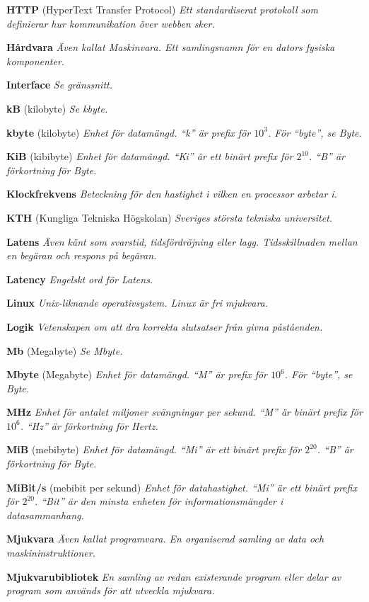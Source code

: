 \documentclass[a4paper, twoside, 11pt, titlepage]{article}
\begin{document}
	\textbf{HTTP} (HyperText Transfer Protocol) \emph{Ett standardiserat protokoll som definierar hur kommunikation över webben sker.}

	\textbf{Hårdvara} \emph{Även kallat Maskinvara. Ett samlingsnamn för en dators fysiska komponenter.}

	\textbf{Interface} \emph{Se gränssnitt.}

	\textbf{kB} (kilobyte) \emph{Se kbyte.}

	\textbf{kbyte} (kilobyte) \emph{Enhet för datamängd. ``k'' är prefix för $10^{3}$. För ``byte'', se Byte.}

	\textbf{KiB} (kibibyte) \emph{Enhet för datamängd. ``Ki'' är ett binärt prefix för $2^{10}$. ``B'' är förkortning för Byte.}

	\textbf{Klockfrekvens} \emph{Beteckning för den hastighet i vilken en processor arbetar i.}

	\textbf{KTH} (Kungliga Tekniska Högskolan) \emph{Sveriges största tekniska universitet.}

	\textbf{Latens} \emph{Även känt som svarstid, tidsfördröjning eller lagg. Tidsskillnaden mellan en begäran och respons på begäran.}

	\textbf{Latency} \emph{Engelskt ord för Latens.}

	\textbf{Linux} \emph{Unix-liknande operativsystem. Linux är fri mjukvara.}

	\textbf{Logik} \emph{Vetenskapen om att dra korrekta slutsatser från givna påståenden.}

	\textbf{Mb} (Megabyte) \emph{Se Mbyte.}

	\textbf{Mbyte} (Megabyte) \emph{Enhet för datamängd. ``M'' är prefix för $10^{6}$.  För ``byte'', se Byte.}

	\textbf{MHz} \emph{Enhet för antalet miljoner svängningar per sekund. ``M'' är binärt prefix för $10^{6}$. ``Hz'' är förkortning för Hertz.}

	\textbf{MiB} (mebibyte) \emph{Enhet för datamängd. ``Mi'' är ett binärt prefix för $2^{20}$. ``B'' är förkortning för Byte.}

	\textbf{MiBit/s} (mebibit per sekund) \emph{Enhet för datahastighet. ``Mi'' är ett binärt prefix för $2^{20}$. ``Bit'' är den minsta enheten för informationsmängder i datasammanhang.}

	\textbf{Mjukvara} \emph{Även kallat programvara. En organiserad samling av data och maskininstruktioner.}

	\textbf{Mjukvarubibliotek} \emph{En samling av redan existerande program eller delar av program som används för att utveckla mjukvara.}
\end{document}
